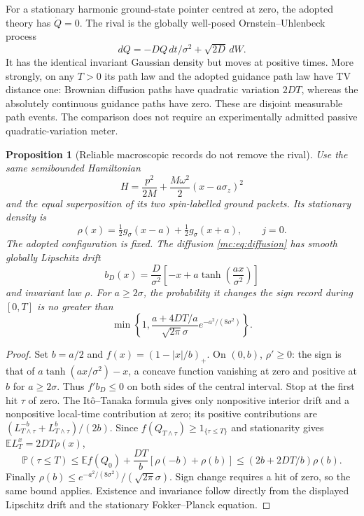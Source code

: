 \documentclass[11pt,oneside,openany]{book}
\newtheorem{proposition}[theorem]{Proposition}
\theoremstyle{definition}
\theoremstyle{remark}\newtheorem{remark}[theorem]{Remark}
\providecommand{\E}{\mathbb E}
\providecommand{\Prb}{\mathbb P}
\begin{document}
For a stationary harmonic ground-state pointer centred at zero, the adopted theory has $\dot Q=0$. The rival is the globally well-posed Ornstein--Uhlenbeck process
\[
 dQ=-D Q\,dt/\sigma^2+\sqrt{2D}\,dW.
\]
It has the identical invariant Gaussian density but moves at positive times. More strongly, on any $T>0$ its path law and the adopted guidance path law have TV distance one: Brownian diffusion paths have quadratic variation $2DT$, whereas the absolutely continuous guidance paths have zero. These are disjoint measurable path events. The comparison does not require an experimentally admitted passive quadratic-variation meter.

\begin{proposition}[Reliable macroscopic records do not remove the rival]\label{mc:prop:rivalarchive}
Use the same semibounded Hamiltonian
\[
 H=\frac{p^2}{2M}+\frac{M\omega^2}{2}(x-a\sigma_z)^2
\]
and the equal superposition of its two spin-labelled ground packets. Its stationary density is
\[
 \rho(x)=\tfrac12g_\sigma(x-a)+\tfrac12g_\sigma(x+a),\qquad j=0.
\]
The adopted configuration is fixed. The diffusion \eqref{mc:eq:diffusion} has smooth globally Lipschitz drift
\[
 b_D(x)=\frac D{\sigma^2}\left[-x+a\tanh\left(\frac{ax}{\sigma^2}\right)\right]
\]
and invariant law $\rho$. For $a\ge2\sigma$, the probability it changes the sign record during $[0,T]$ is no greater than
\begin{equation}\label{mc:eq:rivalbound}
 \min\left\{1,\frac{a+4DT/a}{\sqrt{2\pi}\sigma}
                         e^{-a^2/(8\sigma^2)}\right\}.
\end{equation}
\end{proposition}
\begin{proof}
Set $b=a/2$ and $f(x)=(1-|x|/b)_+$. On $(0,b)$, $\rho'\ge0$: the sign is that of $a\tanh(ax/\sigma^2)-x$, a concave function vanishing at zero and positive at $b$ for $a\ge2\sigma$. Thus $f'b_D\le0$ on both sides of the central interval. Stop at the first hit $\tau$ of zero. The It\^o--Tanaka formula gives only nonpositive interior drift and a nonpositive local-time contribution at zero; its positive contributions are $(L_{T\wedge\tau}^{-b}+L_{T\wedge\tau}^{b})/(2b)$. Since $f(Q_{T\wedge\tau})\ge1_{\{\tau\le T\}}$ and stationarity gives $\E L_T^x=2DT\rho(x)$,
\[
 \Prb(\tau\le T)\le\E f(Q_0)+\frac{DT}{b}[\rho(-b)+\rho(b)]
 \le(2b+2DT/b)\rho(b).
\]
Finally $\rho(b)\le e^{-a^2/(8\sigma^2)}/(\sqrt{2\pi}\sigma)$. Sign change requires a hit of zero, so the same bound applies. Existence and invariance follow directly from the displayed Lipschitz drift and the stationary Fokker--Planck equation.
\end{proof}
\end{document}
